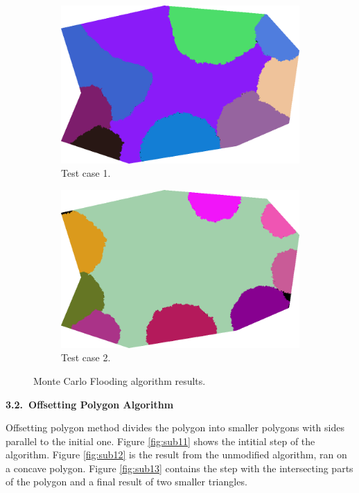 \documentclass[11pt,leqno]{book}
\newcommand{\subsect}[1]{\vskip 3mm\par{\bf#1}}
\begin{document}
\begin{figure}[h!]
\centering
\begin{subfigure}{.5\textwidth}
  \centering
  \includegraphics[width=.5\linewidth]{pic08.png}
  \caption{Test case 1.}
  \label{fig:sub7}
\end{subfigure}
\begin{subfigure}{.5\textwidth}
  \centering
  \includegraphics[width=.5\linewidth]{pic09.png}
  \caption{Test case 2.}
  \label{fig:sub8}
\end{subfigure}
\caption{Monte Carlo Flooding algorithm results.}
\label{fig:five}
\end{figure}
\FloatBarrier

\subsect{3.2.~Offsetting Polygon Algorithm}

Offsetting polygon method divides the polygon into smaller polygons with sides parallel to the initial one. Figure \ref{fig:sub11} shows the intitial step of the algorithm. Figure \ref{fig:sub12} is the result from the unmodified algorithm, ran on a concave polygon. Figure \ref{fig:sub13} contains the step with the intersecting parts of the polygon and a final result of two smaller triangles.
\end{document}
